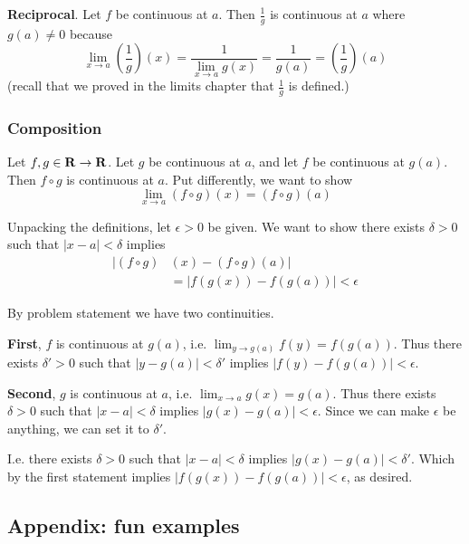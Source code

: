 \textbf{Reciprocal}. Let $f$ be continuous at $a$. Then $\frac{1}{g}$ is continuous at $a$ where $g(a)\neq 0$ because
\[\lim_{x\to a}\left(\frac{1}{g}\right)(x)=\frac{1}{\lim_{x\to a}g(x)}=\frac{1}{g(a)}=\left(\frac{1}{g}\right)(a)\]
(recall that we proved in the limits chapter that $\frac{1}{g}$ is defined.)

\subsubsection{Composition}
Let $f,g\in\mathbf{R}\to\mathbf{R}$. Let $g$ be continuous at $a$, and let $f$ be continuous at $g(a)$. Then $f\circ g$ is continuous at $a$. Put differently, we want to show
\[\lim_{x\to a}(f\circ g)(x)=(f\circ g)(a)\]

Unpacking the definitions, let $\epsilon>0$ be given. We want to show there exists $\delta>0$ such that $|x-a|<\delta$ implies
\begin{align*}
    |(f\circ g)&(x)-(f\circ g)(a)|\\
    &=|f(g(x))-f(g(a))|<\epsilon
\end{align*}

By problem statement we have two continuities.

\vs

\textbf{First}, $f$ is continuous at $g(a)$, i.e. $\lim_{y\to g(a)}f(y)=f(g(a))$. Thus there exists $\delta'>0$ such that $|y-g(a)|<\delta'$ implies $|f(y)-f(g(a))|<\epsilon$.

\vs

\textbf{Second}, $g$ is continuous at $a$, i.e. $\lim_{x\to a}g(x)=g(a)$. Thus there exists $\delta>0$ such that $|x-a|<\delta$ implies $|g(x)-g(a)|<\epsilon$. Since we can make $\epsilon$ be anything, we can set it to $\delta'$.

\vs

I.e. there exists $\delta>0$ such that $|x-a|<\delta$ implies $|g(x)-g(a)|<\delta'$. Which by the first statement implies $|f(g(x))-f(g(a))|<\epsilon$, as desired.

\subsection{Appendix: fun examples}

